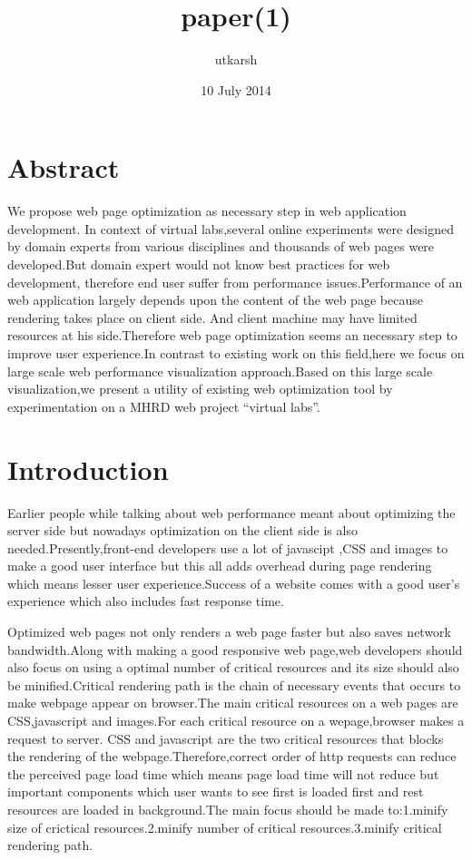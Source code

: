 \documentclass[11pt]{article}
\title{paper(1)}
\author{utkarsh}
\date{10 July 2014}
\begin{document}
\maketitle

\setcounter{tocdepth}{3}
\tableofcontents
\vspace*{1cm}
\section{Abstract}
\label{sec-1}

We propose web page optimization as necessary step in web application development. In context of virtual labs,several online experiments were designed by domain experts from various disciplines and thousands of web pages were developed.But domain expert would not know best practices for web development, therefore end user suffer from performance issues.Performance of an web application largely depends upon the content of the web page because rendering takes place on client side. And client machine may have limited resources at his side.Therefore web page optimization seems an necessary step to improve user experience.In contrast to existing work on this field,here we focus on large scale web performance visualization approach.Based on this large scale visualization,we present a utility of existing web optimization tool  by experimentation on a MHRD web project ``virtual labs''.

\section{Introduction}
\label{sec-2}


Earlier people while talking about web performance meant about optimizing the server side but nowadays optimization on the client side is also needed.Presently,front-end developers use a lot of javascipt ,CSS and images to make a good user interface but this all adds overhead during page rendering which means lesser user experience.Success of a website comes with a good user's experience which also includes fast response time.

Optimized web pages not only renders a web page faster but also saves network bandwidth.Along with making a good responsive web page,web developers should also focus on using a optimal number of critical resources and its size should also be minified.Critical rendering path is the chain of necessary events that occurs to make webpage appear on browser.The main critical resources on a web pages are CSS,javascript and images.For each critical resource on a wepage,browser makes a request to server. CSS and javascript are the two critical resources that blocks the rendering of the webpage.Therefore,correct order of http requests can reduce the perceived page load time which means page load time will not reduce but important components which user wants to see first is loaded first and rest resources are loaded in background.The main focus should be made to:1.minify size of crictical resources.2.minify number of critical resources.3.minify critical rendering path.
\end{document}
